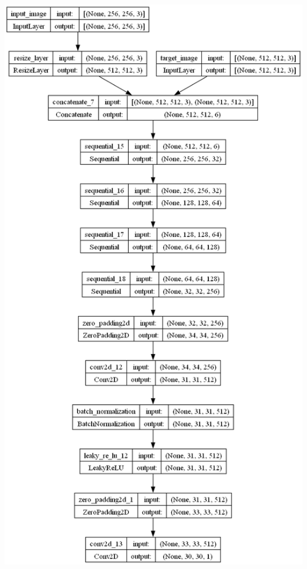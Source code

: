 \documentclass{article}
\begin{document}
\begin{enumerate}[label=\arabic*.]
        \includegraphics[height=0.95\textheight]{../imgs/srgan_discriminator.png}
        \newpage
\end{enumerate}
\end{document}
